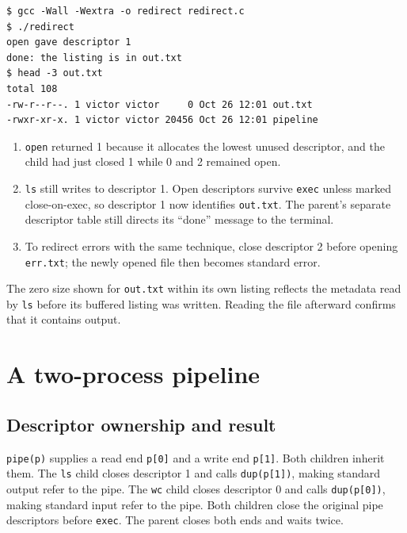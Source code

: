\documentclass{../latex/utmreport}
\providecommand{\tightlist}{\setlength{\itemsep}{0pt}\setlength{\parskip}{0pt}}
\begin{document}
\begin{lstlisting}
$ gcc -Wall -Wextra -o redirect redirect.c
$ ./redirect
open gave descriptor 1
done: the listing is in out.txt
$ head -3 out.txt
total 108
-rw-r--r--. 1 victor victor     0 Oct 26 12:01 out.txt
-rwxr-xr-x. 1 victor victor 20456 Oct 26 12:01 pipeline
\end{lstlisting}

\begin{enumerate}
\def\labelenumi{\arabic{enumi}.}
\tightlist
\item
  \texttt{open} returned 1 because it allocates the lowest unused
  descriptor, and the child had just closed 1 while 0 and 2 remained
  open.
\item
  \texttt{ls} still writes to descriptor 1. Open descriptors survive
  \texttt{exec} unless marked close-on-exec, so descriptor 1 now
  identifies \texttt{out.txt}. The parent's separate descriptor table
  still directs its ``done'' message to the terminal.
\item
  To redirect errors with the same technique, close descriptor 2 before
  opening \texttt{err.txt}; the newly opened file then becomes standard
  error.
\end{enumerate}

The zero size shown for \texttt{out.txt} within its own listing reflects
the metadata read by \texttt{ls} before its buffered listing was
written. Reading the file afterward confirms that it contains output.

\chapter{A two-process pipeline}\label{a-two-process-pipeline}

\section{Descriptor ownership and
result}\label{descriptor-ownership-and-result}

\texttt{pipe(p)} supplies a read end \texttt{p{[}0{]}} and a write end
\texttt{p{[}1{]}}. Both children inherit them. The \texttt{ls} child
closes descriptor 1 and calls \texttt{dup(p{[}1{]})}, making standard
output refer to the pipe. The \texttt{wc} child closes descriptor 0 and
calls \texttt{dup(p{[}0{]})}, making standard input refer to the pipe.
Both children close the original pipe descriptors before \texttt{exec}.
The parent closes both ends and waits twice.
\end{document}
